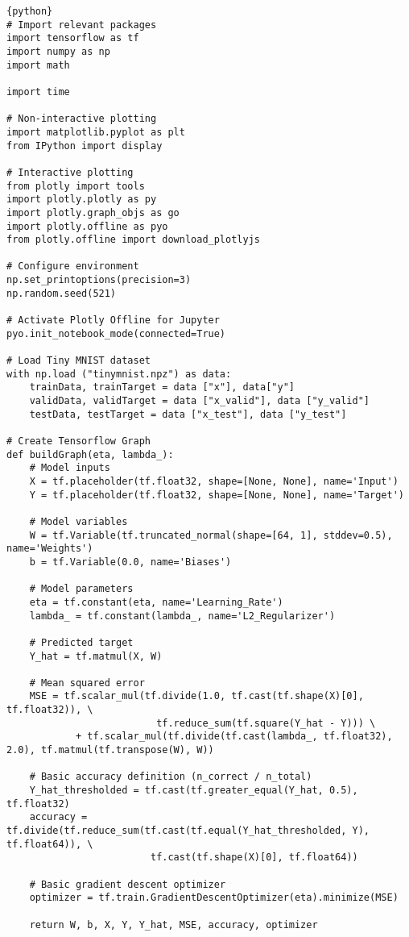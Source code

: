 \documentclass[a4paper,12pt]{article}
\begin{document}
\begin{verbatim}
{python}
# Import relevant packages
import tensorflow as tf
import numpy as np
import math

import time

# Non-interactive plotting
import matplotlib.pyplot as plt
from IPython import display

# Interactive plotting
from plotly import tools
import plotly.plotly as py
import plotly.graph_objs as go
import plotly.offline as pyo
from plotly.offline import download_plotlyjs

# Configure environment
np.set_printoptions(precision=3)
np.random.seed(521)

# Activate Plotly Offline for Jupyter
pyo.init_notebook_mode(connected=True)

# Load Tiny MNIST dataset
with np.load ("tinymnist.npz") as data:
    trainData, trainTarget = data ["x"], data["y"]
    validData, validTarget = data ["x_valid"], data ["y_valid"]
    testData, testTarget = data ["x_test"], data ["y_test"]
    
# Create Tensorflow Graph
def buildGraph(eta, lambda_):
    # Model inputs
    X = tf.placeholder(tf.float32, shape=[None, None], name='Input')
    Y = tf.placeholder(tf.float32, shape=[None, None], name='Target')
    
    # Model variables
    W = tf.Variable(tf.truncated_normal(shape=[64, 1], stddev=0.5), name='Weights')
    b = tf.Variable(0.0, name='Biases')
    
    # Model parameters
    eta = tf.constant(eta, name='Learning_Rate')
    lambda_ = tf.constant(lambda_, name='L2_Regularizer')
    
    # Predicted target
    Y_hat = tf.matmul(X, W)
    
    # Mean squared error
    MSE = tf.scalar_mul(tf.divide(1.0, tf.cast(tf.shape(X)[0], tf.float32)), \
                          tf.reduce_sum(tf.square(Y_hat - Y))) \
            + tf.scalar_mul(tf.divide(tf.cast(lambda_, tf.float32), 2.0), tf.matmul(tf.transpose(W), W))
    
    # Basic accuracy definition (n_correct / n_total)
    Y_hat_thresholded = tf.cast(tf.greater_equal(Y_hat, 0.5), tf.float32)
    accuracy = tf.divide(tf.reduce_sum(tf.cast(tf.equal(Y_hat_thresholded, Y), tf.float64)), \
                         tf.cast(tf.shape(X)[0], tf.float64))
    
    # Basic gradient descent optimizer
    optimizer = tf.train.GradientDescentOptimizer(eta).minimize(MSE)
    
    return W, b, X, Y, Y_hat, MSE, accuracy, optimizer
\end{verbatim}
\end{document}
